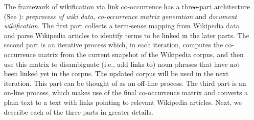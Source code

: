 The framework of wikification via link co-occurrence
has a three-part architecture (See
): {\em preprocess of wiki data},
{\em co-occurrence matrix generation} and {\em document wikification}.
The first part collects a term-sense mapping from Wikipedia data and
parse Wikipedia articles to identify terms to be linked in the later parts.
The second part is an iterative process which, in each iteration, computes
the co-occurrence matrix from the current snapshot of the Wikipedia corpus,
and then use this matrix to disambiguate (i.e., add links to) noun phrases that
have not been linked yet in the corpus. The updated corpus will be used
in the next iteration. This part can be thought of as an off-line process.
The third part is an on-line process, which makes use of the final
co-occurrence matrix and converts a plain text to a text with links pointing
to relevant Wikipedia articles.
Next, we describe each of the three parts in
greater details.

